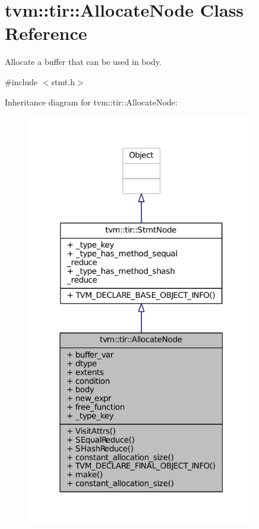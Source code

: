 \hypertarget{classtvm_1_1tir_1_1AllocateNode}{}\section{tvm\+:\+:tir\+:\+:Allocate\+Node Class Reference}
\label{classtvm_1_1tir_1_1AllocateNode}


Allocate a buffer that can be used in body.  




{\ttfamily \#include $<$stmt.\+h$>$}



Inheritance diagram for tvm\+:\+:tir\+:\+:Allocate\+Node\+:
\nopagebreak
\begin{figure}[H]
\begin{center}
\leavevmode
\includegraphics[width=285pt]{classtvm_1_1tir_1_1AllocateNode__inherit__graph}
\end{center}
\end{figure}


